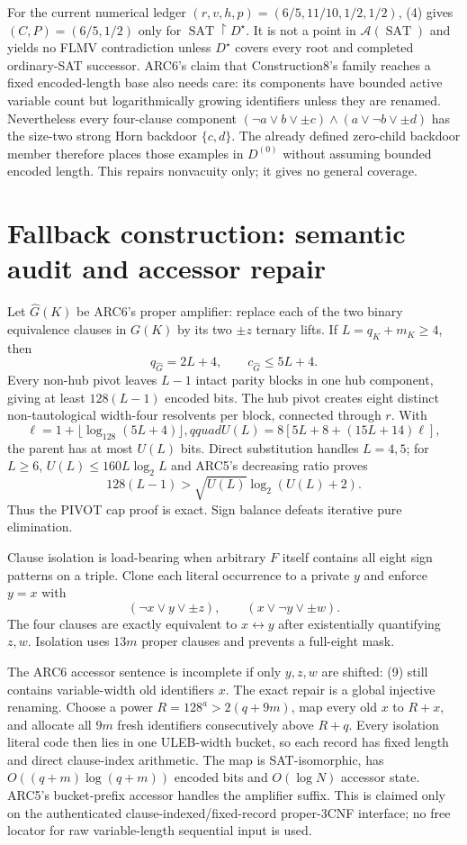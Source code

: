 \documentclass[11pt]{article}
\newcommand{\SAT}{\operatorname{SAT}}
\newcommand{\A}{\mathcal A}
\begin{document}
For the current numerical ledger
$(r,v,h,p)=(6/5,11/10,1/2,1/2)$, (4) gives $(C,P)=(6/5,1/2)$ only for
$\SAT\upharpoonright D^\star$.  It is not a point in $\A(\SAT)$ and yields no
FLMV contradiction unless $D^\star$ covers every root and completed
ordinary-SAT successor.  ARC6's claim that Construction8's family reaches a
fixed encoded-length base also needs care: its components have bounded active
variable count but logarithmically growing identifiers unless they are
renamed.  Nevertheless every four-clause component
$(\neg a\vee b\vee\pm c)\wedge(a\vee\neg b\vee\pm d)$ has the size-two
strong Horn backdoor $\{c,d\}$.  The already defined zero-child backdoor
member therefore places those examples in $D^{(0)}$ without assuming bounded
encoded length.  This repairs nonvacuity only; it gives no general coverage.

\section{Fallback construction: semantic audit and accessor repair}
Let $\widehat G(K)$ be ARC6's proper amplifier: replace each of the two binary
equivalence clauses in $G(K)$ by its two $\pm z$ ternary lifts.  If
$L=q_K+m_K\ge4$, then
\[
 q_{\widehat G}=2L+4,\qquad c_{\widehat G}\le5L+4.       \tag{6}
\]
Every non-hub pivot leaves $L-1$ intact parity blocks in one hub component,
giving at least $128(L-1)$ encoded bits.  The hub pivot creates eight
distinct non-tautological width-four resolvents per block, connected through
$r$.  With
\[
 \ell=1+\lfloor\log_{128}(5L+4)\rfloor,qquad
 U(L)=8[5L+8+(15L+14)\ell],                              \tag{7}
\]
the parent has at most $U(L)$ bits.  Direct substitution handles $L=4,5$;
for $L\ge6$, $U(L)\le160L\log_2L$ and ARC5's decreasing ratio proves
\[
128(L-1)>\sqrt{U(L)}\log_2(U(L)+2).                      \tag{8}
\]
Thus the PIVOT cap proof is exact.  Sign balance defeats iterative pure
elimination.

Clause isolation is load-bearing when arbitrary $F$ itself contains all
eight sign patterns on a triple.  Clone each literal occurrence to a private
$y$ and enforce $y=x$ with
\[
 (\neg x\vee y\vee\pm z),\qquad(x\vee\neg y\vee\pm w).  \tag{9}
\]
The four clauses are exactly equivalent to $x\leftrightarrow y$ after
existentially quantifying $z,w$.  Isolation uses $13m$ proper clauses and
prevents a full-eight mask.

The ARC6 accessor sentence is incomplete if only $y,z,w$ are shifted: (9)
still contains variable-width old identifiers $x$.  The exact repair is a
global injective renaming.  Choose a power $R=128^a>2(q+9m)$, map every old
$x$ to $R+x$, and allocate all $9m$ fresh identifiers consecutively above
$R+q$.  Every isolation literal code then lies in one ULEB-width bucket, so
each record has fixed length and direct clause-index arithmetic.  The map is
SAT-isomorphic, has $O((q+m)\log(q+m))$ encoded bits and $O(\log N)$ accessor
state.  ARC5's bucket-prefix accessor handles the amplifier suffix.  This is
claimed only on the authenticated clause-indexed/fixed-record proper-3CNF
interface; no free locator for raw variable-length sequential input is used.
\end{document}
